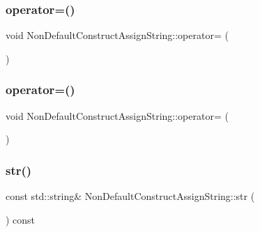 \subsubsection{\texorpdfstring{operator=()}{operator=()}\hspace{0.1cm}{\footnotesize\ttfamily [1/2]}}
{\footnotesize\ttfamily void Non\+Default\+Construct\+Assign\+String\+::operator= (\begin{DoxyParamCaption}\item[{const \mbox{\hyperlink{class_non_default_construct_assign_string}{Non\+Default\+Construct\+Assign\+String}} \&}]{ }\end{DoxyParamCaption})\hspace{0.3cm}{\ttfamily [private]}}

\mbox{\label{class_non_default_construct_assign_string_affc4454f81eb10342ddb98c0ff0f424d}} 
\subsubsection{\texorpdfstring{operator=()}{operator=()}\hspace{0.1cm}{\footnotesize\ttfamily [2/2]}}
{\footnotesize\ttfamily void Non\+Default\+Construct\+Assign\+String\+::operator= (\begin{DoxyParamCaption}\item[{const \mbox{\hyperlink{class_non_default_construct_assign_string}{Non\+Default\+Construct\+Assign\+String}} \&}]{ }\end{DoxyParamCaption})\hspace{0.3cm}{\ttfamily [private]}}

\mbox{\label{class_non_default_construct_assign_string_a7b428e839204101cb3b7f5b14a66688c}} 
\subsubsection{\texorpdfstring{str()}{str()}\hspace{0.1cm}{\footnotesize\ttfamily [1/2]}}
{\footnotesize\ttfamily const std\+::string\& Non\+Default\+Construct\+Assign\+String\+::str (\begin{DoxyParamCaption}{ }\end{DoxyParamCaption}) const\hspace{0.3cm}{\ttfamily [inline]}}

